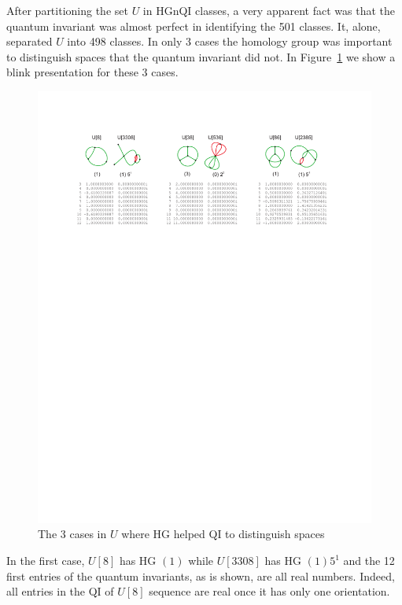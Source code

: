 After partitioning the set $U$ in HGnQI classes, a very apparent
fact was that the quantum invariant was almost perfect in
identifying the 501 classes. It, alone, separated $U$ into 498
classes. In only 3 cases the homology group was important to
distinguish spaces that the quantum invariant did not. In
Figure~\ref{fig:qiFailure} we show a blink presentation for
these 3 cases.
\begin{figure}[htp]
   \begin{center}
      \leavevmode
      \includegraphics[width=15cm]{fig/qiFailure.pdf}
   \end{center}
   \vspace{-0.7cm}
   \caption{ The 3 cases in $U$ where HG helped QI to distinguish spaces}
   \label{fig:qiFailure}
\end{figure}
In the first case, $U[8]$ has HG $(1)$
while $U[3308]$ has HG $(1) 5^1$ and the 12 first
entries of the quantum invariants, as is shown,
are all real numbers. Indeed, all entries in the QI of $U[8]$
sequence are real once it has only one orientation.
